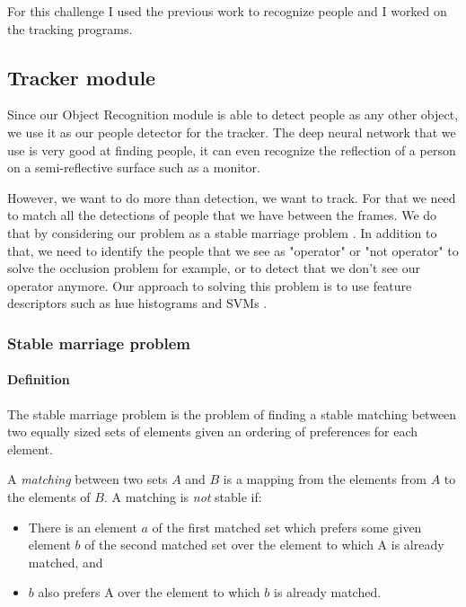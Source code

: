 \documentclass[a4paper, twocolumn]{article}
\begin{document}
    For this challenge I used the previous work to recognize people and I worked on the tracking programs.

    \subsection{Tracker module}

    Since our Object Recognition module is able to detect people as any other object, we use it as our people detector for the tracker. The deep neural network that we use is very good at finding people, it can even recognize the reflection of a person on a semi-reflective surface such as a monitor.

    However, we want to do more than detection, we want to track. For that we need to match all the detections of people that we have between the frames. We do that by considering our problem as a stable marriage problem \cite{gale62a}. In addition to that, we need to identify the people that we see as "operator" or "not operator" to solve the occlusion problem for example, or to detect that we don't see our operator anymore.
    Our approach to solving this problem is to use feature descriptors such as hue histograms and SVMs \cite{Cortes1995}. 

    \subsubsection{Stable marriage problem}

    \paragraph{Definition} The stable marriage problem is the problem of finding a stable matching between two equally sized sets of elements given an ordering of preferences for each element.

    A \textit{matching} between two sets $A$ and $B$ is a mapping from the elements from $A$ to the elements of $B$. A matching is \emph{not} stable if:
    \begin{itemize}
        \item There is an element $a$ of the first matched set which prefers some given element $b$ of the second matched set over the element to which A is already matched, and
        \item $b$ also prefers A over the element to which $b$ is already matched.
    \end{itemize}
\end{document}
